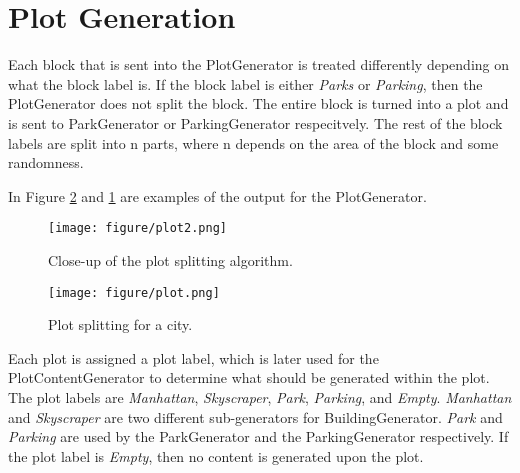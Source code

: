 \section{Plot Generation}
Each block that is sent into the PlotGenerator is treated differently depending on what the block label is. 
If the block label is either \textit{Parks} or \textit{Parking}, then the PlotGenerator does not split the block. 
The entire block is turned into a plot and is sent to ParkGenerator or ParkingGenerator respecitvely.
The rest of the block labels are split into n parts, where n depends on the area of the block and some randomness. 

In Figure \ref{fig:plot} and \ref{fig:plot2} are examples of the output for the PlotGenerator.

\begin{figure}[H]
  \centering

  \texttt{[image: figure/plot2.png]}
  \caption{Close-up of the plot splitting algorithm.}

  \label{fig:plot2}
\end{figure}

\begin{figure}[H]
  \centering

  \texttt{[image: figure/plot.png]}
  \caption{Plot splitting for a city.}

  \label{fig:plot}
\end{figure}

Each plot is assigned a plot label, which is later used for the PlotContentGenerator to determine what should be generated within the plot.
The plot labels are \textit{Manhattan}, \textit{Skyscraper}, \textit{Park}, \textit{Parking}, and \textit{Empty}.
\textit{Manhattan} and \textit{Skyscraper} are two different sub-generators for BuildingGenerator. 
\textit{Park} and \textit{Parking} are used by the ParkGenerator and the ParkingGenerator respectively.
If the plot label is \textit{Empty}, then no content is generated upon the plot. 
